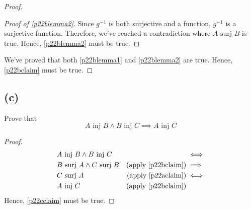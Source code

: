 \documentclass{article}
\newcommand{\surj}{\text{ surj }}
\newcommand{\inj}{\text{ inj }}
\newenvironment{subproof}[1][\proofname]{%
	\renewcommand{\qedsymbol}{$\blacksquare$}%
	\begin{proof}[#1]%
	}{%
	\end{proof}%
}
\begin{document}
\begin{proof}
\begin{subproof}[Proof of \eqref{p22blemma2}]
		Since $g^{-1}$ is both surjective and a function, $g^{-1}$ is a surjective function. Therefore, we've reached a contradiction where $A \surj B$ is true. Hence, \eqref{p22blemma2} must be true.
	\end{subproof}

	We've proved that both \eqref{p22blemma1} and \eqref{p22blemma2} are true. Hence, \eqref{p22bclaim} must be true.
\end{proof}

\subsection{(c)}
Prove that
\begin{equation}\label{p22cclaim}
	A \inj B \land B \inj C \implies A \inj C
\end{equation}
\begin{proof}
	\begin{align*}
		 & A \inj B \land B \inj C   &                                  & \iff     \\
		 & B \surj A \land C \surj B & (\text{apply \eqref{p22bclaim}}) & \implies \\
		 & C \surj A                 & (\text{apply \eqref{p22aclaim}}) & \iff     \\
		 & A \inj C                  & (\text{apply \eqref{p22bclaim}})
	\end{align*}
	Hence, \eqref{p22cclaim} must be true.
\end{proof}
\end{document}
